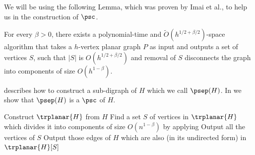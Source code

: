 \documentclass{toc}
\begin{document}
We will be using the following Lemma, which was proven by Imai et al., to help us in the construction of $\psc$.

\begin{lemma}\label{lem:seplemma}\cite{Imai}
For every $\beta > 0$, there exists a
%
polynomial-time   %
and $\tilde{O}(h^{1/2 + \beta/2})$-space %
algorithm that takes a $h$-vertex planar graph $P$ as input and outputs a set of vertices $S$, such that $|S|$ is $O(h^{1/2 + \beta/2})$ and removal of $S$ disconnects the graph into components of size $O(h^{1-\beta})$.
\end{lemma}

 describes how to construct a  %
sub-digraph %
 of $H$ which we call $\psep(H)$. In  we show that $\psep(H)$ is a $\psc$ of $H$.

\begin{algorithm}
\LinesNumbered
\caption{Construction of \psep(H)}
\label{alg:psepH}

Construct $\trplanar{H}$ from $H$\;
Find a set $S$ of vertices in $\trplanar{H}$ which divides it into components of size $O(n^{1-\beta})$ by applying  \label{line:spacedom}\;
Output all the vertices of $S$\; 
Output those edges of %
$H$ which are also (in its undirected form) in $\trplanar{H}[S]$\;

\end{algorithm}
\end{document}
